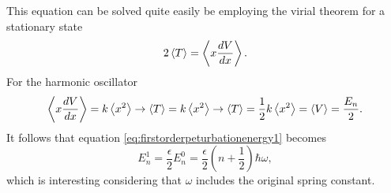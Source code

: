 \documentclass[11pt]{amsart}
\begin{document}
This equation can be solved quite easily be employing the virial theorem for a stationary state
\begin{equation}
\label{eq:virial}
2\ev{T} = \ev{x\frac{dV}{dx}}.
\end{equation}
For the harmonic oscillator
\begin{equation*}
\ev{x\frac{dV}{dx}}= k \ev{x^2} \rightarrow \ev{T} =  k \ev{x^2} \rightarrow \ev{T} = \frac{1}{2}k\ev{x^2} = \ev{V} = \frac{E_n}{2}.
\end{equation*}
It follows that equation \ref{eq:firstorderpeturbationenergy1} becomes
\begin{equation}
E_n^1 = \frac{\epsilon}{2}E_n^0 = \frac{\epsilon}{2}\left(n + \frac{1}{2} \right) \hbar \omega,
\end{equation}
which is interesting considering that $\omega$ includes the original spring constant.
\end{document}
